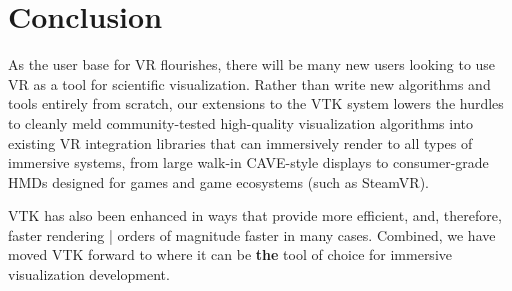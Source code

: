\section{Conclusion}

As the user base for VR flourishes, there will be many
new users looking to use VR as a tool for scientific visualization.
Rather than write new algorithms and tools entirely from scratch,
our extensions to the VTK system lowers the hurdles to cleanly
meld community-tested high-quality visualization algorithms into
existing VR integration libraries that can immersively render to
all types of immersive systems, from large walk-in CAVE-style displays
to consumer-grade HMDs designed for games and game ecosystems (such
as SteamVR).

VTK has also been enhanced in ways that provide more efficient, and,
therefore, faster rendering | orders of magnitude faster in many cases.
Combined, we have moved VTK forward to where it can be \textbf{the}
tool of choice for immersive visualization development.

